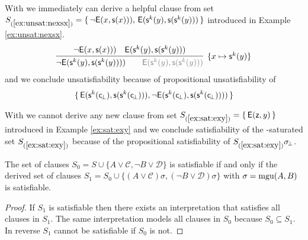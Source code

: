 \begin{example}
	With \InstGen we immediately can derive a helpful clause from set
$S_{(\ref{ex:unsat:nexsx})} =
\{\,
{ \lnot{\mathsf E}(x, {\mathsf s}(x)))},\, 
{ {\mathsf E}({\mathsf s}^k(y), {\mathsf s}({\mathsf s}^k(y)))}
\,\}$ 
 introduced in Example \ref{ex:unsat:nexsx}. 
\begin{gather*}
\infer[\{x\mapsto\msucc^k(y)\}]{
	{ \lnot\mE(\msucc^k(y), \msucc(\msucc^k(y))))} \qquad
	{\colG \mE(\msucc^k(y), \msucc(\msucc^k(y)))}
}{
	{ \lnot\mE(x, \msucc(x)))} &
	{ \mE(\msucc^k(y), \msucc(\msucc^k(y)))}
}
\end{gather*}
and we conclude unsatisfiability because of propositional unsatisfiability of 
\begin{gather*}
\{\,
	{\mathsf E}({\mathsf s}^k({\mathsf c}\!_\bot), {\mathsf s}({\mathsf s}^k({\mathsf c}\!_\bot))), \lnot{\mathsf E}({\mathsf s}^k({\mathsf c}\!_\bot), {\mathsf s}({\mathsf s}^k({\mathsf c}\!_\bot)))) 
\,\}
\end{gather*}
	
\end{example}

\begin{example}
	With \InstGen we cannot derive any new clause from set 
	$S_{(\ref{ex:sat:exy})  } = \{\,{\mathsf E}({\mathsf z},y)\,\}$ 
	introduced in Example \ref{ex:sat:exy} and we conclude satisfiability
	of the \InstGen-saturated set $S_{(\ref{ex:sat:exy})  }$ 
	because of the propositional satisfiability of $S_{(\ref{ex:sat:exy})  }\sigma\!_\bot$.
\end{example}

\begin{lemma}
	The set of clauses 
	$S_0 = S \cup
	\{ 
		 A\lor\mathcal C, \lnot B\lor\mathcal D
	\}$ 
	is satisfiable if and only if
	the derived set of clauses 
	$S_1 = S_0 \cup \{ (A\lor\mathcal C)\sigma, (\lnot B\lor\mathcal D)\sigma\}$
	with $\sigma = \operatorname{mgu}(A,B)$ is satisfiable.
\end{lemma}

\begin{proof}
	If $S_1$ is satisfiable then there exists an interpretation that satisfies all clauses in $S_1$. 
	The same interpretation models all clauses in $S_0$ because $S_0\subseteq S_1$.
	In reverse $S_1$ cannot be satisfiable if $S_0$ is not.
	
	
\end{proof}


